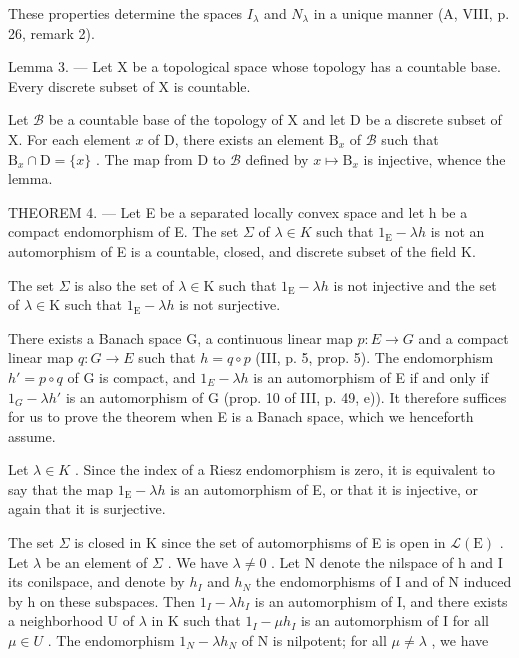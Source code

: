 These properties determine the spaces \(I_{\lambda}\) and \(N_{\lambda}\) in a unique manner (A, VIII, p. 26, remark 2).

Lemma 3. --- Let X be a topological space whose topology has a countable base. Every discrete subset of X is countable.

Let \(\mathcal{B}\) be a countable base of the topology of X and let D be a discrete subset of X. For each element \(x\) of D, there exists an element \(\mathrm{B}_x\) of \(\mathcal{B}\) such that \(\mathrm{B}_x \cap \mathrm{D} = \{x\}\) . The map from D to \(\mathcal{B}\) defined by \(x \mapsto \mathrm{B}_x\) is injective, whence the lemma.

THEOREM 4. --- Let E be a separated locally convex space and let h be a compact endomorphism of E. The set \(\Sigma\) of \(\lambda \in K\) such that \(1_{\mathrm{E}} - \lambda h\) is not an automorphism of E is a countable, closed, and discrete subset of the field K.

The set \(\Sigma\) is also the set of \(\lambda\in\mathrm{K}\) such that \(1_{\mathrm{E}}-\lambda h\) is not injective and the set of \(\lambda\in\mathrm{K}\) such that \(1_{\mathrm{E}}-\lambda h\) is not surjective.

There exists a Banach space G, a continuous linear map \(p: E \rightarrow G\) and a compact linear map \(q: G \rightarrow E\) such that \(h = q \circ p\) (III, p. 5, prop. 5). The endomorphism \(h' = p \circ q\) of G is compact, and \(1_{E} - \lambda h\) is an automorphism of E if and only if \(1_{G} - \lambda h'\) is an automorphism of G (prop. 10 of III, p. 49, e)). It therefore suffices for us to prove the theorem when E is a Banach space, which we henceforth assume.

Let \(\lambda \in K\) . Since the index of a Riesz endomorphism is zero, it is equivalent to say that the map \(1_{\mathrm{E}} - \lambda h\) is an automorphism of E, or that it is injective, or again that it is surjective.

The set \(\Sigma\) is closed in K since the set of automorphisms of E is open in \(\mathcal{L}(\mathrm{E})\) . Let \(\lambda\) be an element of \(\Sigma\) . We have \(\lambda \neq 0\) . Let N denote the nilspace of h and I its conilspace, and denote by \(h_{I}\) and \(h_{N}\) the endomorphisms of I and of N induced by h on these subspaces. Then \(1_{I} - \lambda h_{I}\) is an automorphism of I, and there exists a neighborhood U of \(\lambda\) in K such that \(1_{I} - \mu h_{I}\) is an automorphism of I for all \(\mu \in U\) . The endomorphism \(1_{N} - \lambda h_{N}\) of N is nilpotent; for all \(\mu \neq \lambda\) , we have

